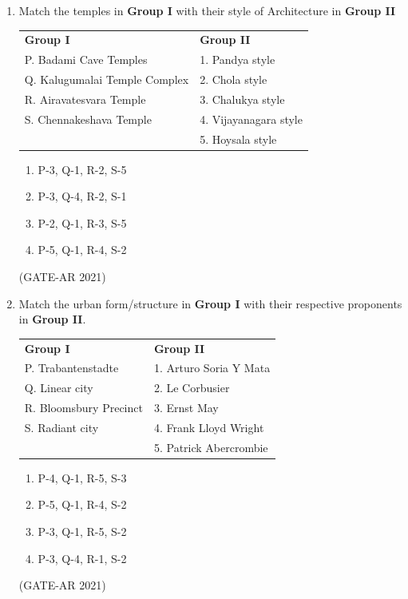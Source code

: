 \documentclass[a4paper,10pt]{article}
\begin{document}
\begin{enumerate}
    \item Match the temples in \textbf{Group I} with their style of Architecture in \textbf{Group II} \\
    \begin{tabular}{ l l }
    \textbf{Group I} & \textbf{Group II} \\
    P. Badami Cave Temples & 1. Pandya style \\
    Q. Kalugumalai Temple Complex & 2. Chola style \\
    R. Airavatesvara Temple & 3. Chalukya style \\
    S. Chennakeshava Temple & 4. Vijayanagara style \\
    & 5. Hoysala style \\
    \end{tabular}
    \begin{multicols}{2}
    \begin{enumerate}
        \item P-3, Q-1, R-2, S-5
        \item P-3, Q-4, R-2, S-1
        \item P-2, Q-1, R-3, S-5
        \item P-5, Q-1, R-4, S-2
    \end{enumerate}
    \end{multicols}
    \hfill (GATE-AR 2021)

    \item Match the urban form/structure in \textbf{Group I} with their respective proponents in \textbf{Group II}. \\
    \begin{tabular}{ l l }
    \textbf{Group I} & \textbf{Group II} \\
    P. Trabantenstadte & 1. Arturo Soria Y Mata \\
    Q. Linear city & 2. Le Corbusier \\
    R. Bloomsbury Precinct & 3. Ernst May \\
    S. Radiant city & 4. Frank Lloyd Wright \\
    & 5. Patrick Abercrombie \\
    \end{tabular}
    \begin{multicols}{2}
    \begin{enumerate}
        \item P-4, Q-1, R-5, S-3
        \item P-5, Q-1, R-4, S-2
        \item P-3, Q-1, R-5, S-2
        \item P-3, Q-4, R-1, S-2
    \end{enumerate}
    \end{multicols}
    \hfill (GATE-AR 2021)


\end{enumerate}
\end{document}
